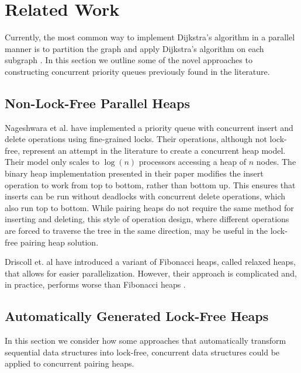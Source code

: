 \documentclass{acm_proc_article-sp}
\begin{document}
\section{Related Work}
Currently, the most common way to implement Dijkstra's algorithm in
a parallel manner is to partition the graph and apply
Dijkstra's algorithm on
each subgraph \cite{crauser98}. In this section we outline
some of the novel approaches to constructing concurrent priority queues
previously found in the literature.

\subsection{Non-Lock-Free Parallel Heaps}

Nageshwara et al. \cite{nageshwara88} have implemented a priority queue with concurrent insert and delete operations using fine-grained locks. Their operations, although not lock-free, represent an attempt in the literature to create a concurrent heap model. Their model only scales to $\log(n)$ processors accessing a heap of $n$ nodes. The binary heap implementation presented in their paper modifies the insert operation to work from top to bottom, rather than bottom up. This ensures that inserts can be run without deadlocks with concurrent delete operations, which also run top to bottom. While pairing heaps do not require the same method for inserting and deleting, this style of operation design, where different operations are forced to traverse the tree in the same direction, may be useful in the lock-free pairing heap solution.

Driscoll et. al \cite{driscoll88} have introduced a variant of Fibonacci heaps, called
relaxed heaps, that allows for easier parallelization. However, their approach
is complicated \cite{elmasry10} and, in practice, performs worse than Fibonacci heaps \cite{moret94}.  

\subsection{Automatically Generated Lock-Free Heaps}

In this section we consider how some approaches that automatically
transform sequential data structures into lock-free, concurrent data
structures could be applied to concurrent pairing heaps.
\end{document}
